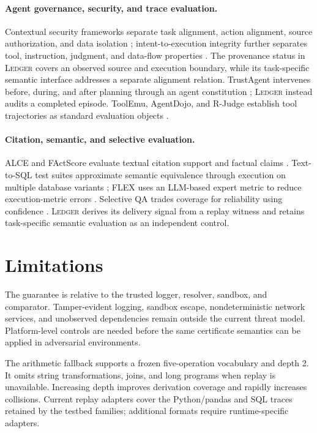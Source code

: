\documentclass[5p,times]{elsarticle}
\newcommand{\ledger}{\textsc{Ledger}\xspace}
\begin{document}
\paragraph{Agent governance, security, and trace evaluation.}
Contextual security frameworks separate task alignment, action alignment, source authorization, and data isolation \citep{siu2026security}; intent-to-execution integrity further separates tool, instruction, judgment, and data-flow properties \citep{qu2026intent}. The provenance status in \ledger covers an observed source and execution boundary, while its task-specific semantic interface addresses a separate alignment relation. TrustAgent intervenes before, during, and after planning through an agent constitution \citep{hua2024trustagent}; \ledger instead audits a completed episode. ToolEmu, AgentDojo, and R-Judge establish tool trajectories as standard evaluation objects \citep{ruan2024toolemu,debenedetti2024agentdojo,yuan2024rjudge}.

\paragraph{Citation, semantic, and selective evaluation.}
ALCE and FActScore evaluate textual citation support and factual claims \citep{gao2023alce,min2023factscore}. Text-to-SQL test suites approximate semantic equivalence through execution on multiple database variants \citep{zhong2020testsuite}; FLEX uses an LLM-based expert metric to reduce execution-metric errors \citep{kim2025flex}. Selective QA trades coverage for reliability using confidence \citep{kamath2020selective}. \ledger derives its delivery signal from a replay witness and retains task-specific semantic evaluation as an independent control.

\section{Limitations}\label{sec:limitations}

The guarantee is relative to the trusted logger, resolver, sandbox, and comparator. Tamper-evident logging, sandbox escape, nondeterministic network services, and unobserved dependencies remain outside the current threat model. Platform-level controls are needed before the same certificate semantics can be applied in adversarial environments.

The arithmetic fallback supports a frozen five-operation vocabulary and depth 2. It omits string transformations, joins, and long programs when replay is unavailable. Increasing depth improves derivation coverage and rapidly increases collisions. Current replay adapters cover the Python/pandas and SQL traces retained by the testbed families; additional formats require runtime-specific adapters.
\end{document}
